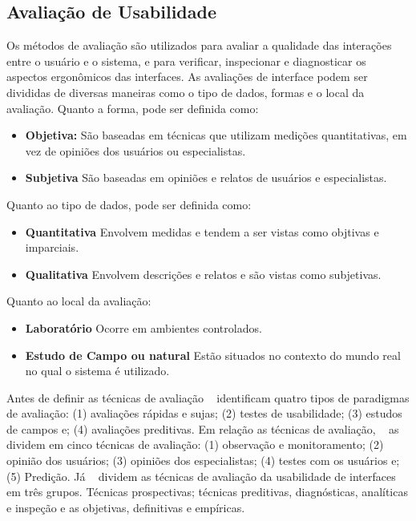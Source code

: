 \subsection {Avaliação de Usabilidade}

Os métodos de avaliação são utilizados para avaliar a qualidade das interações entre o usuário e o sistema, e para verificar, inspecionar e diagnosticar os aspectos ergonômicos das interfaces.
%
As avaliações de interface podem ser divididas de diversas maneiras como o tipo de dados, formas e o local da avaliação. Quanto a forma, pode ser definida como:

	\begin{itemize}
		\item \textbf{Objetiva:} São baseadas em técnicas que utilizam medições quantitativas, em vez de opiniões dos usuários ou especialistas.
		\item \textbf{Subjetiva} São baseadas em opiniões e relatos de usuários e especialistas.
	\end{itemize}

	Quanto ao tipo de dados, pode ser definida como:

	\begin{itemize}
		\item \textbf{Quantitativa} Envolvem medidas e tendem a ser vistas como objtivas e imparciais.
		\item \textbf{Qualitativa} Envolvem descrições e relatos e são vistas como subjetivas.
	\end{itemize}

	Quanto ao local da avaliação:

	\begin{itemize}
		\item \textbf{Laboratório} Ocorre em ambientes controlados.
		\item \textbf{Estudo de Campo ou natural} Estão situados no contexto do mundo real no qual o sistema é utilizado.
	\end{itemize}

	 
Antes de definir as técnicas de avaliação ~ identificam quatro tipos de paradigmas de avaliação: (1) avaliações rápidas e sujas; (2) testes de usabilidade; (3) estudos de campos e; (4) avaliações preditivas.
%
Em relação as técnicas de avaliação, ~ as dividem em cinco técnicas de avaliação: (1) observação e monitoramento; (2) opinião dos usuários; (3) opiniões dos especialistas; (4) testes com os usuários e; (5) Predição. 
%
Já ~ dividem as técnicas de avaliação da usabilidade de interfaces em três grupos. Técnicas prospectivas; técnicas preditivas, diagnósticas, analíticas e inspeção e as objetivas, definitivas e empíricas.


